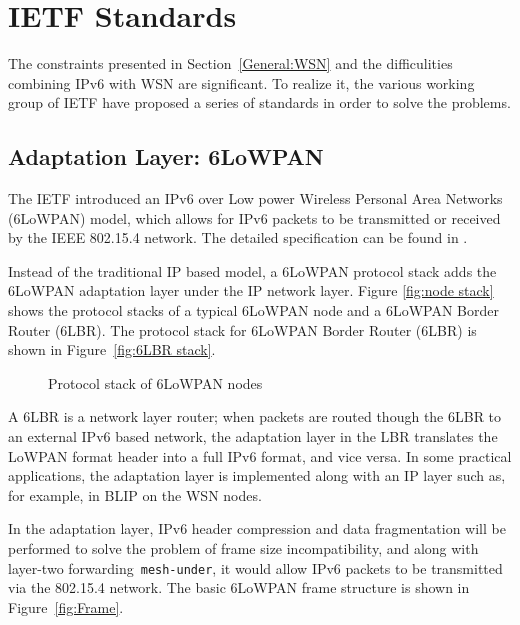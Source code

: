 \chapter{IETF Standards}
\label{IETF}
The constraints presented in Section~\ref{General:WSN} and the difficulities combining IPv6 with WSN are significant. To realize it, the various working group of IETF have proposed a series of standards in order to solve the problems.

\section{Adaptation Layer: 6LoWPAN}
\label{Intr:6LoWPAN}
The IETF introduced an IPv6 over Low power Wireless Personal Area Networks (6LoWPAN) model, which allows for IPv6 packets to be transmitted or received by the IEEE 802.15.4 network. The detailed specification can be found in \cite{RFC 4944}.
\newline

Instead of the traditional IP based model, a 6LoWPAN protocol stack adds the 6LoWPAN adaptation layer under the IP network layer. Figure \ref{fig:node stack} shows the protocol stacks of a typical 6LoWPAN node and a 6LoWPAN Border Router (6LBR)\@. The protocol stack for 6LoWPAN Border Router (6LBR) is shown in Figure~\ref{fig:6LBR stack}.

\begin{figure}[htbp]
  \begin{center}
    \leavevmode
    \caption{Protocol stack of 6LoWPAN nodes}
    \label{fig:protocol stack}
  \end{center}
\end{figure}

A 6LBR is a network layer router; when packets are routed though the 6LBR to an external IPv6 based network, the adaptation layer in the LBR translates the LoWPAN format header into a full IPv6 format, and
vice versa. In some practical applications, the adaptation layer is implemented along with an IP
layer such as, for example, in BLIP on the WSN nodes.
\newline

In the adaptation layer, IPv6 header compression and data fragmentation will be performed to solve the problem of frame size incompatibility, and along with layer-two forwarding~\texttt{mesh-under}, it would allow IPv6 packets to be transmitted via the 802.15.4 network. The basic 6LoWPAN frame structure is shown in Figure~\ref{fig:Frame}.  

